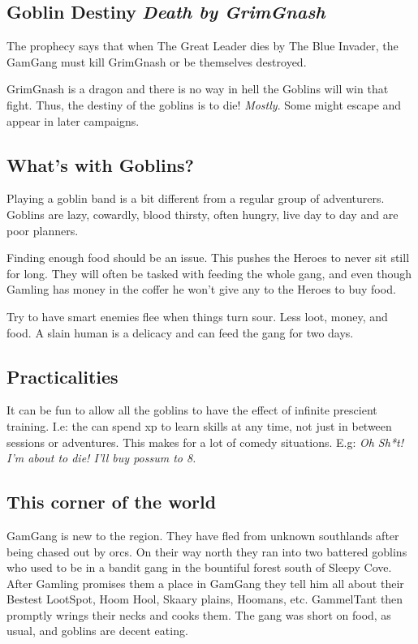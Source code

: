 \subsection*{Goblin Destiny\,\textendash\,\emph{Death by GrimGnash}}

The prophecy says that when The Great Leader dies by The Blue Invader, the GamGang must kill GrimGnash or be themselves destroyed.

GrimGnash is a dragon and there is no way in hell the Goblins will win that fight. Thus, the destiny of the goblins is to die! \emph{Mostly}. Some might escape and appear in later campaigns.


\subsection*{What's with Goblins?}

Playing a goblin band is a bit different from a regular group of adventurers. Goblins are lazy, cowardly, blood thirsty, often hungry, live day to day and are poor planners.

Finding enough food should be an issue. This pushes the Heroes to never sit still for long. They will often be tasked with feeding the whole gang, and even though Gamling has money in the coffer he won't give any to the Heroes to buy food.

Try to have smart enemies flee when things turn sour. Less loot, money, and food. A slain human is a delicacy and can feed the gang for two days.


\subsection*{Practicalities}

It can be fun to allow all the goblins to have the effect of infinite prescient training. I.e: the can spend xp to learn skills at any time, not just in between sessions or adventures. This makes for a lot of comedy situations. E.g: \emph{Oh Sh*t! I'm about to die! I'll buy possum to 8.}


\subsection*{This corner of the world}

GamGang is new to the region. They have fled from unknown southlands after being chased out by orcs. On their way north they ran into two battered goblins who used to be in a bandit gang in the bountiful forest south of Sleepy Cove. After Gamling promises them a place in GamGang they tell him all about their Bestest LootSpot, Hoom Hool, Skaary plains, Hoomans, etc. GammelTant then promptly wrings their necks and cooks them. The gang was short on food, as usual, and goblins are decent eating.

